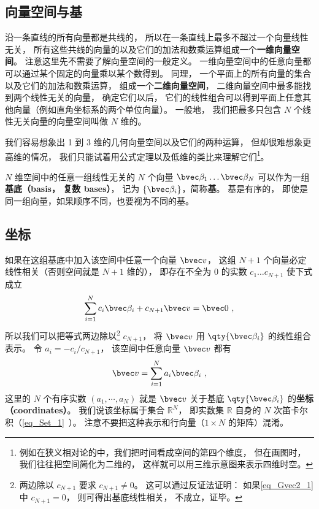 \subsection{向量空间与基}
沿一条直线的所有向量都是共线的， 所以在一条直线上最多不超过一个向量线性无关， 所有这些共线的向量的以及它们的加法和数乘运算组成一个\textbf{一维向量空间}。 注意这里先不需要了解向量空间的一般定义。 一维向量空间中的任意向量都可以通过某个固定的向量乘以某个数得到。 同理， 一个平面上的所有向量的集合以及它们的加法和数乘运算， 组成一个\textbf{二维向量空间}， 二维向量空间中最多能找到两个线性无关的向量， 确定它们以后， 它们的线性组合可以得到平面上任意其他向量（例如直角坐标系的两个单位向量）。 一般地， 我们把最多只包含 $N$ 个线性无关向量的向量空间叫做 $N$ 维的。

我们容易想象出 1 到 3 维的几何向量空间以及它们的两种运算， 但却很难想象更高维的情况， 我们只能试着用公式定理以及低维的类比来理解它们\footnote{例如在狭义相对论的中，我们把时间看成空间的第四个维度， 但在画图时， 我们往往把空间简化为二维的， 这样就可以用三维示意图来表示四维时空。}。

$N$ 维空间中的任意一组线性无关的 $N$ 个向量 $\bvec \beta_1\dots \bvec \beta_N$ 可以作为一组\textbf{基底（basis， 复数 bases）}， 记为 $\{\bvec \beta_i\}$，简称\textbf{基}。 基是有序的， 即使是同一组向量，如果顺序不同，也要视为不同的基。

\subsection{坐标}
如果在这组基底中加入该空间中任意一个向量 $\bvec v$， 这组 $N+1$ 个向量必定线性相关（否则空间就是 $N+1$ 维的）， 即存在不全为 0 的实数 $c_1\dots c_{N+1}$ 使下式成立
\begin{equation}\label{eq_Gvec2_1}
\sum_{i=1}^{N} c_i \bvec \beta_i + c_{N+1} \bvec v = \bvec 0~,
\end{equation}
所以我们可以把等式两边除以\footnote{两边除以 $c_{N+1}$ 要求 $c_{N+1} \ne 0$。 这可以通过反证法证明： 如果\autoref{eq_Gvec2_1} 中 $c_{N+1} = 0$， 则可得出基底线性相关， 不成立，证毕。} $c_{N+1}$， 将 $\bvec v$ 用 $\qty{\bvec \beta_i}$ 的线性组合表示。 令 $a_i = -c_i/c_{N+1}$， 该空间中任意向量 $\bvec v$ 都有
\begin{equation}\label{eq_Gvec2_5}
\bvec v = \sum_{i=1}^N a_i \bvec \beta_i~,
\end{equation}
这里的 $N$ 个有序实数 $(a_1, \cdots, a_N)$ 就是 $\bvec v$ 关于基底 $\qty{\bvec \beta_i}$ 的\textbf{坐标（coordinates）}。 我们说该坐标属于集合 $\mathbb R^N$， 即实数集 $\mathbb R$ 自身的 $N$ 次笛卡尔积（\autoref{eq_Set_1}~）。 注意不要把这种表示和行向量（$1\times N$ 的矩阵）混淆。

